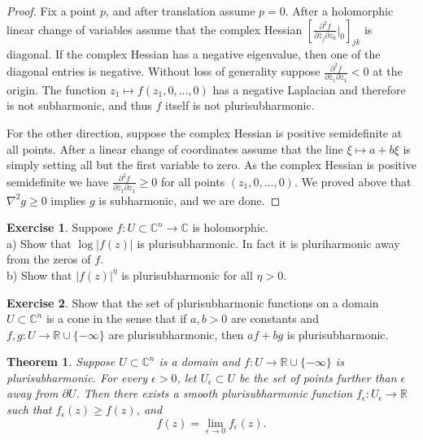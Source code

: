 \documentclass[12pt,openany]{book}
\newcommand{\sabs}[1]{\lvert {#1} \rvert}
\newcommand{\C}{{\mathbb{C}}}
\newcommand{\R}{{\mathbb{R}}}
\theoremstyle{plain}
\newtheorem{thm}{Theorem}[section]
\theoremstyle{remark}
\theoremstyle{definition}
\newenvironment{exbox}{%
    \def\FrameCommand{\vrule width 1pt \relax\hspace {10pt}}%
    \MakeFramed {\advance \hsize -\width \FrameRestore }%
}{%
    \endMakeFramed
}
\theoremstyle{exercise}
\newtheorem{exercise}{Exercise}[section]
\theoremstyle{example}
\begin{document}
\begin{proof}
Fix a point $p$, and after translation assume $p=0$.
After a holomorphic linear change of variables assume that
the complex Hessian
$\left[
\frac{\partial^2 f}{\partial \bar{z}_j \partial z_k}
\Big|_0
\right]_{jk}$ is diagonal.  If the complex Hessian has a negative eigenvalue, then
one of the diagonal entries is negative.
Without loss of generality suppose
$\frac{\partial^2 f}{\partial \bar{z}_1 \partial z_1} < 0$ at the origin.
The function $z_1 \mapsto f(z_1,0,\ldots,0)$ has
a negative Laplacian and therefore is not subharmonic, and thus $f$ itself
is not plurisubharmonic.

For the other direction, suppose the complex Hessian is positive
semidefinite at all points.
After a linear change of coordinates assume that the
line $\xi \mapsto a+b\xi$ is simply setting all but the first variable to
zero.  As the complex Hessian is positive semidefinite we have
$\frac{\partial^2 f}{\partial \bar{z}_1 \partial z_1} \geq 0$ for all
points $(z_1,0,\ldots,0)$.  We proved above that $\nabla^2 g \geq 0$
implies $g$ is subharmonic, and we are done.
\end{proof}

\begin{exbox}
\begin{exercise} \label{exercise:modholplush}
Suppose $f \colon U \subset \C^n \to \C$ is holomorphic.
\\
a) Show that $\log \sabs{f(z)}$ is plurisubharmonic.  In fact it is pluriharmonic away from the zeros of $f$.
\\
b) Show that $\sabs{f(z)}^{\eta}$ is plurisubharmonic for all $\eta > 0$.
\end{exercise}

\begin{exercise}
Show that the set of plurisubharmonic functions on a domain $U \subset \C^n$
is a cone in the sense that if $a,b > 0$ are constants and
$f, g \colon U \to \R \cup \{ -\infty \}$ are plurisubharmonic, then
$a f + b g$ is plurisubharmonic.
\end{exercise}
\end{exbox}

\begin{thm} \label{thm:subharlim}
Suppose $U \subset \C^n$ is a domain and $f \colon U \to \R \cup \{
-\infty \}$ is plurisubharmonic.  For every $\epsilon > 0$,
let $U_\epsilon \subset U$
be the set of points further than $\epsilon$ away from $\partial U$.
Then there exists a smooth plurisubharmonic function
$f_\epsilon \colon U_\epsilon \to \R$ such that $f_\epsilon(z) \geq
f(z)$, and
\begin{equation*}
f(z) = \lim_{\epsilon \to 0} f_\epsilon(z) .
\end{equation*}
\end{thm}
\end{document}
